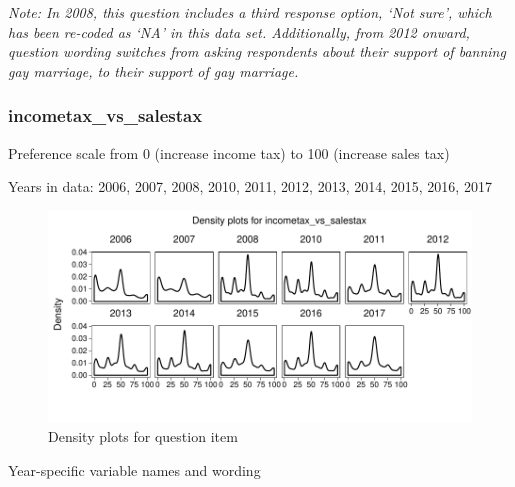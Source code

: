 \documentclass[12pt]{article}
\begin{document}
\emph{Note: In 2008, this question includes a third response option,
`Not sure', which has been re-coded as `NA' in this data set.
Additionally, from 2012 onward, question wording switches from asking
respondents about their support of banning gay marriage, to their
support of gay marriage.}

\subsubsection{incometax\_vs\_salestax}\label{incometax_vs_salestax}

Preference scale from 0 (increase income tax) to 100 (increase sales
tax)

Years in data: 2006, 2007, 2008, 2010, 2011, 2012, 2013, 2014, 2015,
2016, 2017

\begin{figure}

{\centering \includegraphics{CCES_Cumulative_Preferences_2006-2019_guide_files/figure-latex/unnamed-chunk-4-2} 

}

\caption{Density plots for question item}\label{fig:unnamed-chunk-4-2}
\end{figure}

Year-specific variable names and wording
\end{document}
